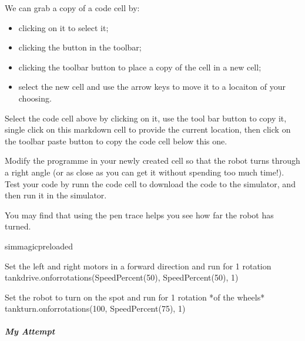 \documentclass[letterpaper,10pt,english]{sphinxmanual}
\begin{document}
We can grab a copy of a code cell by:
\begin{itemize}
\item {} 
clicking on it to select it;

\item {} 
clicking the  button in the toolbar;

\item {} 
clicking the  toolbar button to place a copy of the cell in a new cell;

\item {} 
select the new cell and use the arrow keys to move it to a locaiton of your choosing.

\end{itemize}

Select the code cell above by clicking on it, use the tool bar button to copy it, single click on this markdown cell to provide the current location, then click on the toolbar paste button to copy the code cell below this one.

Modify the programme in your newly created cell so that the robot turns through a right angle (or as close as you can get it without spending too much time!). Test your code by runn the code cell to download the code to the simulator, and then run it in the simulator.

You may find that using the pen trace helps you see how far the robot has turned.

{
\begin{sphinxVerbatim}[commandchars=\\\{\}]
\llap{\color{nbsphinxin}[ ]:\,\hspace{\fboxrule}\hspace{\fboxsep}}\PYGZpc{}\PYGZpc{}sim\PYGZus{}magic\PYGZus{}preloaded

\PYGZsh{} Set the left and right motors in a forward direction
\PYGZsh{} and run for 1 rotation
tank\PYGZus{}drive.on\PYGZus{}for\PYGZus{}rotations(SpeedPercent(50), SpeedPercent(50), 1)


\PYGZsh{} Set the robot to turn on the spot
\PYGZsh{} and run for 1 rotation *of the wheels*
tank\PYGZus{}turn.on\PYGZus{}for\PYGZus{}rotations(\PYGZhy{}100, SpeedPercent(75), 1)
\end{sphinxVerbatim}
}


\subparagraph{My Attempt}
\label{\detokenize{content/01_Robot_Lab/Section_00_01:My-Attempt}}
\end{document}

